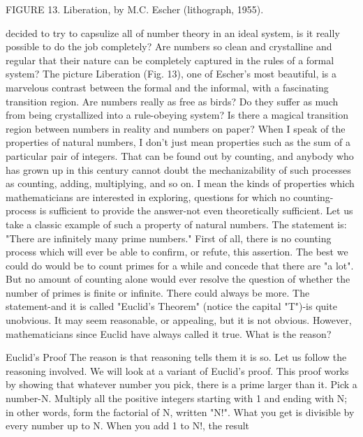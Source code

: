 FIGURE 13. Liberation, by M.C. Escher (lithograph, 1955). 







decided to try to capsulize all of number theory in an ideal system, is it really possible to do the job completely? Are numbers so clean and crystalline and regular that their nature can be completely captured in the rules of a formal system? The picture Liberation (Fig. 13), one of Escher's most beautiful, is a marvelous contrast between the formal and the informal, with a fascinating transition region. Are numbers really as free as birds? Do they suffer as much from being crystallized into a rule-obeying system? Is there a magical transition region between numbers in reality and numbers on paper? When I speak of the properties of natural numbers, I don't just mean properties such as the sum of a particular pair of integers. That can be found out by counting, and anybody who has grown up in this century cannot doubt the mechanizability of such processes as counting, adding, multiplying, and so on. I mean the kinds of properties which mathematicians are interested in exploring, questions for which no counting- process is sufficient to provide the answer-not even theoretically sufficient. Let us take a classic example of such a property of natural numbers. The statement is: "There are infinitely many prime numbers." First of all, there is no counting process which will ever be able to confirm, or refute, this assertion. The best we could do would be to count primes for a while and concede that there are "a lot". But no amount of counting alone would ever resolve the question of whether the number of primes is finite or infinite. There could always be more. The statement-and it is called "Euclid's Theorem" (notice the capital "T")-is quite unobvious. It may seem reasonable, or appealing, but it is not obvious. However, mathematicians since Euclid have always called it true. What is the reason? 

Euclid's Proof The reason is that reasoning tells them it is so. Let us follow the reasoning involved. We will look at a variant of Euclid's proof. This proof works by showing that whatever number you pick, there is a prime larger than it. Pick a number-N. Multiply all the positive integers starting with 1 and ending with N; in other words, form the factorial of N, written "N!". What you get is divisible by every number up to N. When you add 1 to N!, the result 

